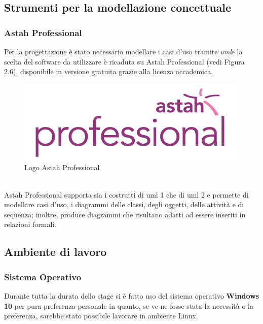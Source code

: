 \subsection{Strumenti per la modellazione concettuale}
\subsubsection{Astah Professional}
Per la progettazione è stato necessario modellare i casi d'uso tramite \emph{\gls{uml}}\glsfirstoccur e la scelta del software da utilizzare è ricaduta su Astah Professional (vedi Figura 2.6), disponibile in versione gratuita grazie alla licenza accademica.
\begin{figure}[h]
	\centering
	\includegraphics[scale=1]{immagini/astah}
	\caption{Logo Astah Professional}
\end{figure}
\\
Astah Professional supporta sia i costrutti di \gls{uml} 1 che di \gls{uml} 2 e permette di modellare casi d’uso, i diagrammi delle classi, degli oggetti, delle attività e di sequenza; inoltre, produce diagrammi che risultano adatti ad essere inseriti in relazioni formali.
\subsection{Ambiente di lavoro}
\subsubsection{Sistema Operativo}
Durante tutta la durata dello stage si è fatto uso del sistema operativo \textbf{Windows 10} per pura preferenza personale in quanto, se ve ne fosse stata la necessità o la preferenza, sarebbe stato possibile lavorare in ambiente Linux.
